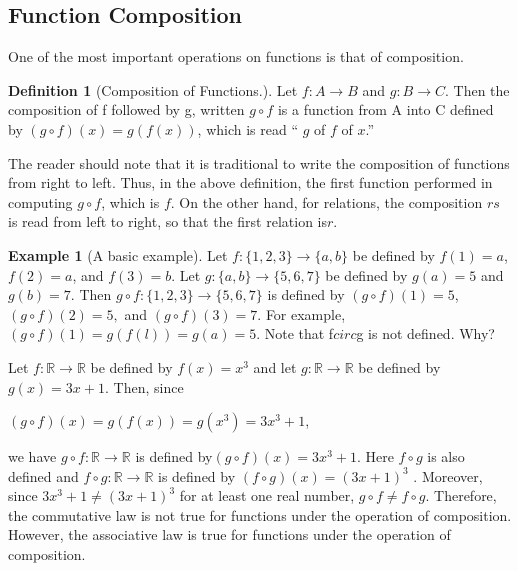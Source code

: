 \documentclass[10pt,]{book}
\theoremstyle{plain}
\theoremstyle{definition}
\newtheorem{definition}[theorem]{Definition}
\theoremstyle{definition}
\newtheorem{example}[theorem]{Example}
\theoremstyle{definition}
\begin{document}
\subsection[Function Composition]{Function Composition}\label{ss-composition}
One of the most important operations on functions is that of composition.%
\begin{definition}[Composition of Functions.]\label{def-composition-of-functions}
\label{notation-5}
Let \(f:A \rightarrow  B\) and \(g:B \rightarrow  C\). Then the composition of f followed by g, written \(g\circ f\) is a function from A into C defined by \((g \circ f)(x) = g(f(x))\), which is read `` \(g\) of \(f\) of \(x\).''%
\end{definition}
\par
The reader should note that it is traditional to write the composition of functions from right to left. Thus, in the above definition, the first function performed in computing \(g \circ f\), which is \(f\). On the other hand, for relations, the composition \(r s\) is read from left
to right, so that the first relation is\(  r\).%
\begin{example}[A basic example]\label{ex-simple-composition}
Let \(f:\{1, 2, 3\}\rightarrow  \{a, b\}\) be defined by \(f(1) = a\), \(f(2) = a\), and \(f(3) = b\). Let \(g:\{a, b\} \rightarrow  \{5, 6, 7\}\) be defined by \(g(a) = 5\) and \(g(b) = 7\). Then \(g\circ f: \{1, 2, 3\}\rightarrow  \{5, 6, 7\}\) is defined by \((g\circ f)(1)= 5\),
\((g\circ f)(2)= 5,\) and \((g\circ f)(3)= 7\). For example, \((g\circ f)(1)= g(f(l)) = g(a) = 5\). Note that f\(circ\)g is not defined. Why?%
\par
 Let \(f:\mathbb{R} \rightarrow  \mathbb{R}\) be defined by \(f(x) = x^3\) and let \(g:\mathbb{R} \rightarrow  \mathbb{R}\) be defined by \(g(x)
= 3x+1\). Then, since

\quad \quad  \((g\circ f)(x) = g(f(x)) = g\left(x^3\right) = 3x^3 + 1\), 

we have \(g\circ f: \mathbb{R} \rightarrow  \mathbb{R}\) is defined by\((g\circ f)(x)= 3x^3 + 1\). Here \(f\circ g\) is also defined and \(f\circ
g:\mathbb{R}\rightarrow \mathbb{R}\) is defined by \((f\circ g)(x)=(3x + 1)^3\) . Moreover, since \(3x ^3+ 1 \neq (3x + 1)^3\) for at least
one real number, \(g\circ f \neq  f\circ g\).  Therefore, the commutative law is not true for functions under the operation of composition.
However, the associative law is true for functions under the operation of composition.
%
\end{example}
\end{document}
